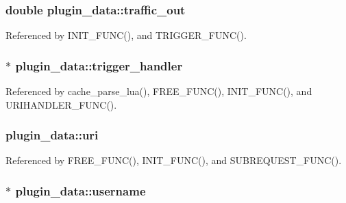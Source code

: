 \hypertarget{structplugin__data_ab2219b8e981f1caf0a423e4d0fa0c5ec}{
\subsubsection[{traffic\-\_\-out}]{\setlength{\rightskip}{0pt plus 5cm}double plugin\-\_\-data\-::traffic\-\_\-out}}\label{structplugin__data_ab2219b8e981f1caf0a423e4d0fa0c5ec}


Referenced by I\-N\-I\-T\-\_\-\-F\-U\-N\-C(), and T\-R\-I\-G\-G\-E\-R\-\_\-\-F\-U\-N\-C().

\hypertarget{structplugin__data_a2fa181fa93fbda4c0e6aff9e434cc8d3}{
\subsubsection[{trigger\-\_\-handler}]{$\ast$ plugin\-\_\-data\-::trigger\-\_\-handler}}\label{structplugin__data_a2fa181fa93fbda4c0e6aff9e434cc8d3}


Referenced by cache\-\_\-parse\-\_\-lua(), F\-R\-E\-E\-\_\-\-F\-U\-N\-C(), I\-N\-I\-T\-\_\-\-F\-U\-N\-C(), and U\-R\-I\-H\-A\-N\-D\-L\-E\-R\-\_\-\-F\-U\-N\-C().

\hypertarget{structplugin__data_a97364e8bab83eddb874eecaccb114282}{
\subsubsection[{uri}]{ plugin\-\_\-data\-::uri}}\label{structplugin__data_a97364e8bab83eddb874eecaccb114282}


Referenced by F\-R\-E\-E\-\_\-\-F\-U\-N\-C(), I\-N\-I\-T\-\_\-\-F\-U\-N\-C(), and S\-U\-B\-R\-E\-Q\-U\-E\-S\-T\-\_\-\-F\-U\-N\-C().

\hypertarget{structplugin__data_a8445132def377794f2b1eb47a674a24b}{
\subsubsection[{username}]{$\ast$ plugin\-\_\-data\-::username}}\label{structplugin__data_a8445132def377794f2b1eb47a674a24b}


